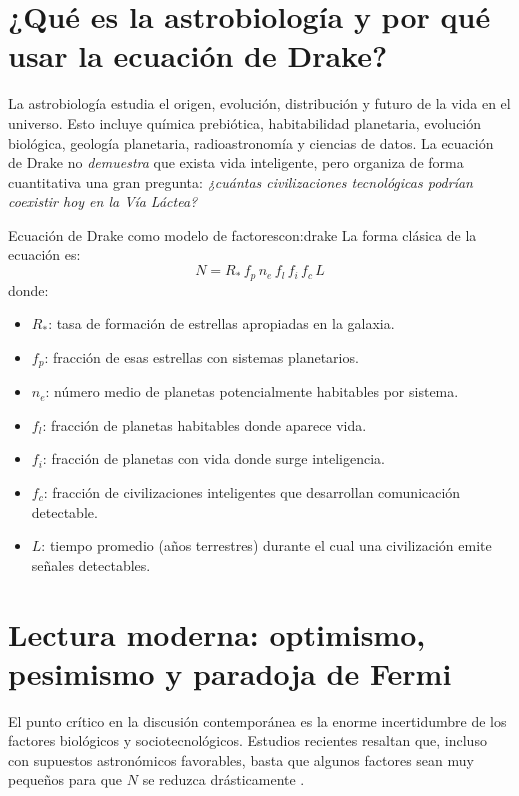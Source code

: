 \documentclass[12pt,oneside]{book}
\begin{document}
\section{¿Qué es la astrobiología y por qué usar la ecuación de Drake?}

La astrobiología estudia el origen, evolución, distribución y futuro de la vida en el universo. Esto incluye química prebiótica, habitabilidad planetaria, evolución biológica, geología planetaria, radioastronomía y ciencias de datos. La ecuación de Drake no \emph{demuestra} que exista vida inteligente, pero organiza de forma cuantitativa una gran pregunta: \textit{¿cuántas civilizaciones tecnológicas podrían coexistir hoy en la Vía Láctea?}

\begin{concepto}{Ecuación de Drake como modelo de factores}{con:drake}
La forma clásica de la ecuación es:
\[
N = R_* \, f_p \, n_e \, f_l \, f_i \, f_c \, L
\]
donde:
\begin{itemize}[leftmargin=1.5em]
    \item $R_*$: tasa de formación de estrellas apropiadas en la galaxia.
    \item $f_p$: fracción de esas estrellas con sistemas planetarios.
    \item $n_e$: número medio de planetas potencialmente habitables por sistema.
    \item $f_l$: fracción de planetas habitables donde aparece vida.
    \item $f_i$: fracción de planetas con vida donde surge inteligencia.
    \item $f_c$: fracción de civilizaciones inteligentes que desarrollan comunicación detectable.
    \item $L$: tiempo promedio (años terrestres) durante el cual una civilización emite señales detectables.
\end{itemize}
\end{concepto}

\section{Lectura moderna: optimismo, pesimismo y paradoja de Fermi}

El punto crítico en la discusión contemporánea es la enorme incertidumbre de los factores biológicos y sociotecnológicos. Estudios recientes resaltan que, incluso con supuestos astronómicos favorables, basta que algunos factores sean muy pequeños para que $N$ se reduzca drásticamente \cite{baak2026implicationspessimisticlowerlimit}.
\end{document}
